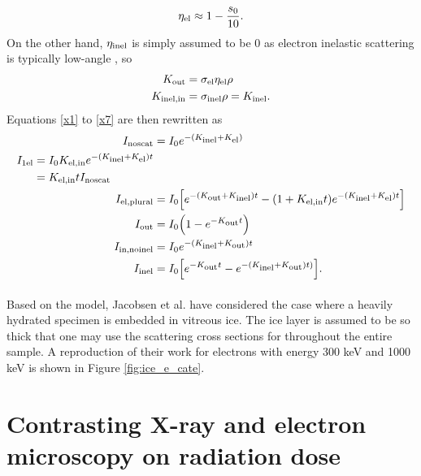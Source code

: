 \documentclass[review]{elsarticle}
\newcommand\nt{\textup{\scriptsize{0}}}
\newcommand\el{\textup{\scriptsize{el}}}
\newcommand\inel{\textup{\scriptsize{inel}}}
\newcommand\elin{\textup{\scriptsize{el,in}}}
\newcommand\inelin{\textup{\scriptsize{inel,in}}}
\newcommand\out{\textup{\scriptsize{out}}}
\newcommand\noscat{\textup{\scriptsize{noscat}}}
\newcommand\sel{\textup{\scriptsize{1el}}}
\newcommand\elpl{\textup{\scriptsize{el,plural}}}
\newcommand\innoinel{\textup{\scriptsize{in,noinel}}}
\begin{document}
\begin{equation}
\eta_\el \approx 1 - \frac{s_0}{10}.
\end{equation}
On the other hand, $\eta_\inel$ is simply assumed to be 0 as electron inelastic scattering is typically low-angle \cite{Williams:2006434}, so
\begin{align}
K_\out &= \sigma_\el \eta_\el \rho \\
K_\inelin &= \sigma_\inel \rho = K_\inel.
\end{align}
Equations \ref{x1} to \ref{x7} are then rewritten as
\begin{align}
I_{\noscat} &= I_{\nt}e^{-(K_{\inel}+K_{\el})}
\label{e1} \\
\begin{split}
\label{e2}
I_{\sel} &= I_{\nt}K_{\elin}e^{-(K_{\inel}+K_{\el})t} 
	\\ &= K_{\elin}tI_{\noscat} 
\end{split} \\
I_{\elpl} &= I_{\nt} \Big[ e^{-(K_{\out}+K_{\inel})t} - (1+K_{\elin}t)e^{-(K_{\inel}+K_{\el})t} \Big]
\label{e3} \\
I_{\out} &= I_{\nt} \Big(1 - e^{-K_{\out}t}\Big)
\label{e4} \\
I_{\innoinel} &= I_{\nt}e^{-(K_{\inel}+K_{\out})t}
\label{e6} \\
I_{\inel} &= I_{\nt}\Big[e^{-K_{\out}t} - e^{-(K_{\inel}+K_{\out})t)}\Big].
\label{e7}
\end{align}

\paragraph{} Based on the model, Jacobsen et al. \cite{Jacobsen:1998vj} have considered the case where a heavily hydrated specimen is embedded in vitreous ice. The ice layer is assumed to be so thick that one may use the scattering cross sections for  throughout the entire sample. A reproduction of their work for electrons with energy 300 keV and 1000 keV is shown in Figure \ref{fig:ice_e_cate}. 

\section{Contrasting X-ray and electron microscopy on radiation dose}
\end{document}
